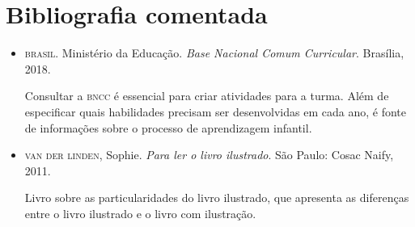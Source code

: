 \documentclass[11pt]{extarticle}
\begin{document}
\section{Bibliografia comentada}

\begin{itemize}
\item \textsc{brasil}. Ministério da Educação. \textit{Base Nacional Comum Curricular}. Brasília, 2018.

Consultar a \textsc{bncc} é essencial para criar atividades para a turma. Além de especificar 
quais habilidades precisam ser desenvolvidas em cada ano, é fonte de informações sobre 
o processo de aprendizagem infantil. 

 
\item \textsc{van der linden}, Sophie. \textit{Para ler o livro ilustrado}. São Paulo: Cosac Naify, 2011.

Livro sobre as particularidades do livro ilustrado, que apresenta as diferenças entre o livro ilustrado e o livro com ilustração. 
\end{itemize}
\end{document}
